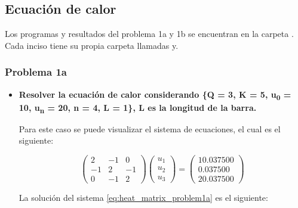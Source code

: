 \subsection{Ecuación de calor}

Los programas y resultados del problema 1a y 1b se encuentran en la carpeta . Cada inciso tiene su propia carpeta llamadas  y.
\subsubsection{Problema 1a}
\begin{itemize}
    \item \textbf{Resolver la ecuación de calor considerando \{Q = 3, K = 5, u\textsubscript{0} = 10, u\textsubscript{n} = 20, n = 4, L = 1\}, L es la longitud de la barra.}

          Para este caso se puede visualizar el sistema de ecuaciones, el cual es el siguiente:

          \begin{equation}
              \begin{pmatrix}
                  2  & -1 & 0  \\
                  -1 & 2  & -1 \\
                  0  & -1 & 2
              \end{pmatrix}
              \begin{pmatrix}
                  u_1 \\
                  u_2 \\
                  u_3
              \end{pmatrix}
              =\begin{pmatrix}
                  10.037500 \\
                  0.037500  \\
                  20.037500
              \end{pmatrix}
              \label{eq:heat_matrix_problem1a}
          \end{equation}

          La solución del sistema \ref{eq:heat_matrix_problem1a} es el siguiente:


\end{itemize}
